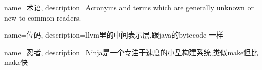 {
    name=术语,
    description={Acronyms and terms which are generally unknown or new to common readers.}
}


{
    name=位码,
    description={llvm里的中间表示层,跟java的bytecode 一样}
}

{
    name=忍者,
    description={Ninja是一个专注于速度的小型构建系统,类似make但比make快}
}
